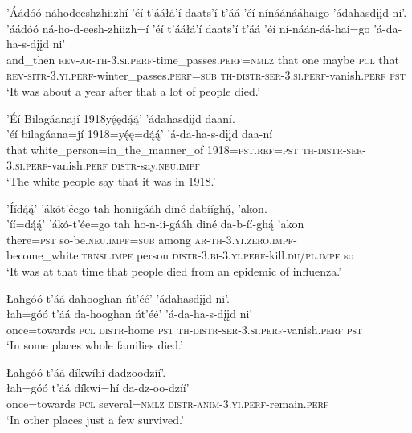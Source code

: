 \ea\label{ex:text6-16-1}
’Áádóó náhodeeshzhiizhí ’éí t’ááłá’í daats’í t’áá ’éí nínáánááhaigo ’ádahasdįįd ni’.\\
\gll ’áádóó	ná-ho-d-eesh-zhiizh=í	’éí	t’ááłá’í	daats’í	t’áá ’éí	ní-náán-áá-hai=go	’á-da-ha-s-dįįd	ni’\\
     and\_then	\textsc{rev}-\textsc{ar}-\textsc{th}-3.\textsc{si}.\textsc{perf}-time\_passes.\textsc{perf}=\textsc{nmlz}	that	one	maybe	\textsc{pcl} that	\textsc{rev}-\textsc{sitr}-3.\textsc{yi}.\textsc{perf}-winter\_passes.\textsc{perf}=\textsc{sub}	\textsc{th}-\textsc{distr}-\textsc{ser}-3.\textsc{si}.\textsc{perf}-vanish.\textsc{perf}	\textsc{pst}\\
\glt `It was about a year after that a lot of people died.'
\z

\ea\label{ex:text6-16-2}
’Éí Bilagáanají 1918yę́ędą́ą́’ ’ádahasdįįd daaní.\\
\gll ’éí	bilagáana=jí	1918=yę́ę=dą́ą́’	’á-da-ha-s-dįįd	daa-ní\\
     that	white\_person=in\_the\_manner\_of	1918=\textsc{pst}.\textsc{ref}=\textsc{pst}	\textsc{th}-\textsc{distr}-\textsc{ser}-3.\textsc{si}.\textsc{perf}-vanish.\textsc{perf}	\textsc{distr}-say.\textsc{neu}.\textsc{impf}\\
\glt `The white people say that it was in 1918.'
\z

\ea\label{ex:text6-16-3}
’Íídą́ą́’ ’ákót’éego tah honiigááh diné dabííghą́, ’akon.\\
\gll ’íí=dą́ą́’	’ákó-t’ée=go	tah ho-n-ii-gááh	diné	da-b-íí-ghą́	’akon\\
     there=\textsc{pst}	so-be.\textsc{neu}.\textsc{impf}=\textsc{sub}	among \textsc{ar}-\textsc{th}-3.\textsc{yi}.\textsc{zero}.\textsc{impf}-become\_white.\textsc{trnsl}.\textsc{impf}	person	\textsc{distr}-3.\textsc{bi}-3.\textsc{yi}.\textsc{perf}-kill.\textsc{du}/\textsc{pl}.\textsc{impf}	so\\
\glt `It was at that time that people died from an epidemic of influenza.'
\z

\ea\label{ex:text6-16-4}
Łahgóó t’áá dahooghan ńt’éé’ ’ádahasdįįd ni’.\\
\gll łah=góó	t’áá	da-hooghan	ńt’éé’	’á-da-ha-s-dįįd	ni’\\
     once=towards	\textsc{pcl}	\textsc{distr}-home	\textsc{pst}	\textsc{th}-\textsc{distr}-\textsc{ser}-3.\textsc{si}.\textsc{perf}-vanish.\textsc{perf}	\textsc{pst}\\
\glt `In some places whole families died.'
\z

\ea\label{ex:text6-16-5}
Łahgóó t’áá díkwíhí dadzoodzíí’.\\
\gll łah=góó	t’áá	díkwí=hí	da-dz-oo-dzíí’\\
     once=towards	\textsc{pcl}	several=\textsc{nmlz}	\textsc{distr}-\textsc{anim}-3.\textsc{yi}.\textsc{perf}-remain.\textsc{perf}\\
\glt `In other places just a few survived.'
\z


